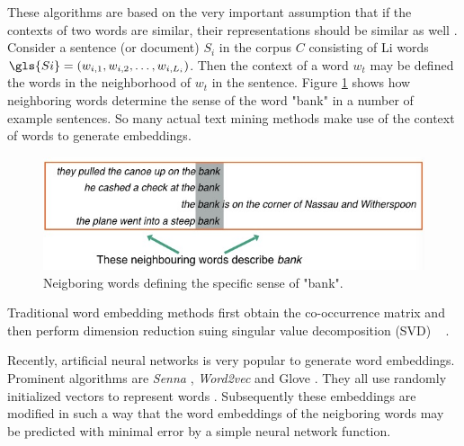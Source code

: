 These algorithms are based on the very important assumption that if the contexts of two words are similar, their representations should be similar as well \citep{Harris1954}.
Consider a sentence (or document) $S_i$ in the corpus $C$ consisting of \gls{Li} %
words $\gls{Si} = (w_{i,1},w_{i,2},\ldots,w_{i,L_i})$. %
Then the context  of a word $w_t$ may be defined the words in the neighborhood of $w_t$ in the sentence.
 Figure \ref{fig:neighbouring_words} shows how neighboring words determine the sense of the word "bank" in a number of example sentences. So many actual text mining methods make use of the context of words to generate embeddings. 
\begin{figure}[H]
\centering
\begin{minipage}{1.0\textwidth}
 
	\includegraphics[width=1.0\textwidth]{neighbouring_words} 
	
\end{minipage}%
\label{fig:neighbouring_words}
\caption{Neigboring words defining the specific sense of "bank".}
\end{figure}	

Traditional word embedding methods first obtain the co-occurrence matrix and then perform dimension reduction suing singular value decomposition (SVD) ~ \citep{DeerwesterDumaisEtAl1990}. 

Recently, artificial neural networks is very popular to generate word embeddings. Prominent algorithms are \emph{Senna} \citep{CollobertWeston2008}, \emph{Word2vec} \citep{MikolovSutskeverEtAl2013} and Glove \citep{PenningtonSocherEtAl2014}. They all use randomly initialized vectors to represent words . Subsequently these embeddings are modified in such a way that the word embeddings of the neigboring words may be predicted with minimal error by a simple neural network function. 


